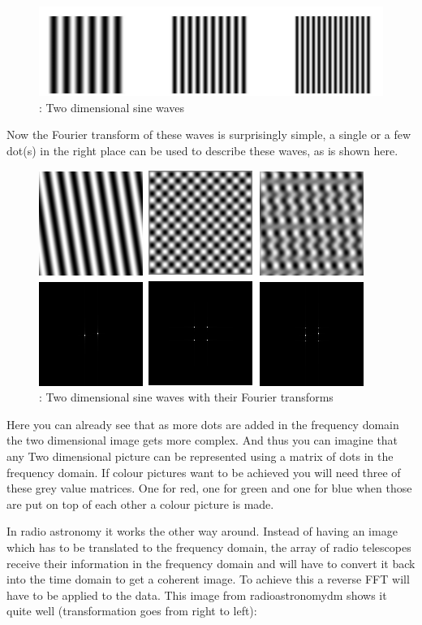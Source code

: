 \documentclass[11pt, A4, oneside]{article}
\begin{document}
\begin{figure}[!ht]
	\centering
	\includegraphics[width=\linewidth]{2d-sine}
	\caption{: Two dimensional sine waves }
	\label{2d_sine}
\end{figure}

Now the Fourier transform of these waves is surprisingly simple, a single or a few dot(s) in the right place can be used to describe these waves, as is shown here.

\begin{figure}[!ht]
	\centering
	\includegraphics[scale=0.6]{sine_with_transform}
	\caption{: Two dimensional sine waves with their Fourier transforms}
	\label{2d_sine_with_transform}
\end{figure} 

Here you can already see that as more dots are added in the frequency domain the two dimensional image gets more complex. And thus you can imagine that any Two dimensional picture can be represented using a matrix of dots in the frequency domain. If colour pictures want to be achieved you will need three of these grey value matrices. One for red, one for green and one for blue when those are put on top of each other a colour picture is made.\par
In radio astronomy it works the other way around. Instead of having an image which has to be translated to the frequency domain, the array of radio telescopes receive their information in the frequency domain and will have to convert it back into the time domain to get a coherent image. To achieve this a reverse FFT will have to be applied to the data. This image from radioastronomydm\cite{interferometry} shows it quite well (transformation goes from right to left): 
\end{document}
